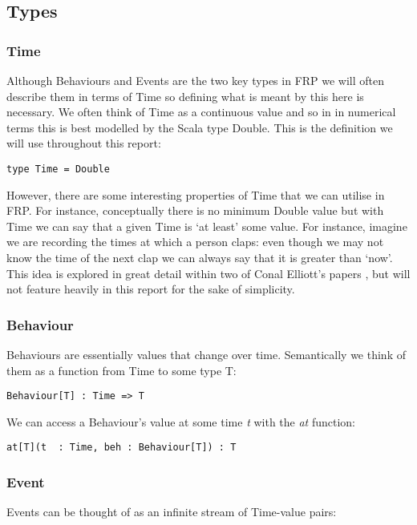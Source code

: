     \subsection{Types}
      \subsubsection{Time}
        Although Behaviours and Events are the two key types in FRP we will often describe them
        in terms of Time so defining what is meant by this here is necessary. We often think of
        Time as a continuous value and so in in numerical terms this is best modelled by the
        Scala type Double. This is the definition we will use throughout this report:

\begin{verbatim}
type Time = Double
\end{verbatim}    

        However, there are some interesting properties of Time that we can utilise in FRP. For instance,
        conceptually there is no minimum Double value but with Time we can say that a given Time is `at least'
        some value. For instance, imagine we are recording the times at which a person claps: even though we
        may not know the time of the next clap we can always say that it is greater than `now'. This idea is explored 
        in great detail within two of Conal Elliott's papers \cite{Elliott1997}, \cite{Elliott2009} but will not feature
        heavily in this report for the sake of simplicity.
   
      \subsubsection{Behaviour}
        Behaviours are essentially values that change over time. Semantically we think of them as
        a function from Time to some type T:

\begin{verbatim}
Behaviour[T] : Time => T
\end{verbatim}
        
        We can access a Behaviour's value at some time \emph{t} with the \emph{at} function:

\begin{verbatim}
at[T](t  : Time, beh : Behaviour[T]) : T
\end{verbatim}
      
      \subsubsection{Event}
        Events can be thought of as an infinite stream of Time-value pairs:

